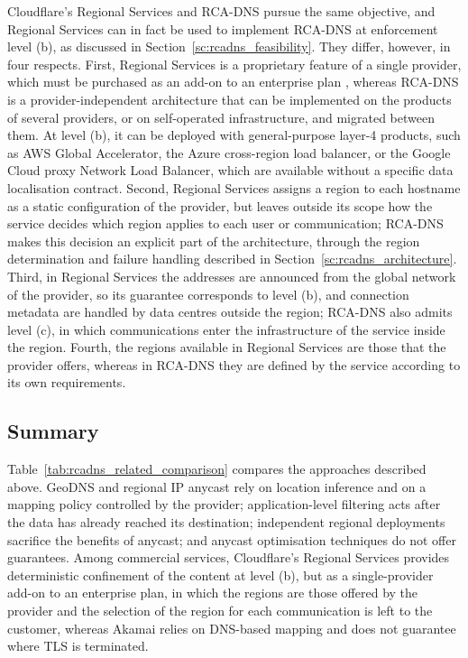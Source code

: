 Cloudflare's Regional Services and RCA-DNS pursue the same objective, and Regional Services can in fact be used to implement RCA-DNS at enforcement level (b), as discussed in Section~\ref{sc:rcadns_feasibility}. They differ, however, in four respects. First, Regional Services is a proprietary feature of a single provider, which must be purchased as an add-on to an enterprise plan \cite{RegionalDocs}, whereas RCA-DNS is a provider-independent architecture that can be implemented on the products of several providers, or on self-operated infrastructure, and migrated between them. At level (b), it can be deployed with general-purpose layer-4 products, such as AWS Global Accelerator, the Azure cross-region load balancer, or the Google Cloud proxy Network Load Balancer, which are available without a specific data localisation contract. Second, Regional Services assigns a region to each hostname as a static configuration of the provider, but leaves outside its scope how the service decides which region applies to each user or communication; RCA-DNS makes this decision an explicit part of the architecture, through the region determination and failure handling described in Section~\ref{sc:rcadns_architecture}. Third, in Regional Services the addresses are announced from the global network of the provider, so its guarantee corresponds to level (b), and connection metadata are handled by data centres outside the region; RCA-DNS also admits level (c), in which communications enter the infrastructure of the service inside the region. Fourth, the regions available in Regional Services are those that the provider offers, whereas in RCA-DNS they are defined by the service according to its own requirements.

\subsection{Summary}
\label{sc:rcadns_related_summary}

Table~\ref{tab:rcadns_related_comparison} compares the approaches described above. GeoDNS and regional IP anycast rely on location inference and on a mapping policy controlled by the provider; application-level filtering acts after the data has already reached its destination; independent regional deployments sacrifice the benefits of anycast; and anycast optimisation techniques do not offer guarantees. Among commercial services, Cloudflare's Regional Services provides deterministic confinement of the content at level (b), but as a single-provider add-on to an enterprise plan, in which the regions are those offered by the provider and the selection of the region for each communication is left to the customer, whereas Akamai relies on DNS-based mapping and does not guarantee where TLS is terminated.

